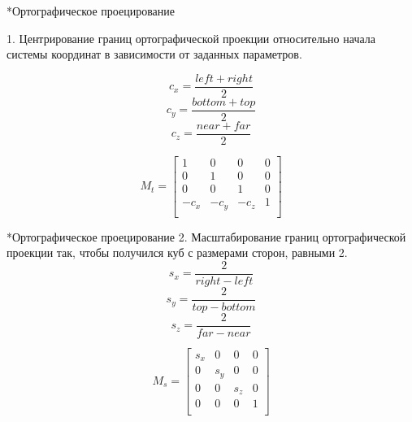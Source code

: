 \documentclass{beamer}
\begin{document}
	\begin{frame}{*Ортографическое проецирование}
		
		1. Центрирование границ ортографической проекции относительно начала системы координат в зависимости от заданных параметров.

		\[
			c_x = \frac{left + right}{2}
		\]
		\[
			c_y = \frac{bottom + top}{2}
		\]
		\[
			c_z = \frac{near + far}{2}
		\]

		\[
			M_t = 
			\begin{bmatrix}
				1 & 0 & 0 & 0 \\
				0 & 1 & 0 & 0 \\
				0 & 0 & 1 & 0 \\
				-c_x & -c_y & -c_z & 1 \\
			\end{bmatrix}	
		\]

	\end{frame}

	\begin{frame}{*Ортографическое проецирование}
		2. Масштабирование границ ортографической проекции так, чтобы получился куб с размерами сторон, равными 2.
		\[
			s_x = \frac{2}{right - left}
		\]
		\[
			s_y = \frac{2}{top - bottom}
		\]
		\[
			s_z =  \frac{2}{far - near}
		\]

		\[
			M_s = 
			\begin{bmatrix}
				s_x & 0 & 0 & 0 \\
				0 & s_y & 0 & 0 \\
				0 & 0 & s_z & 0 \\
				0 & 0 & 0 & 1 \\
			\end{bmatrix}	
		\]
	\end{frame}	
\end{document}
